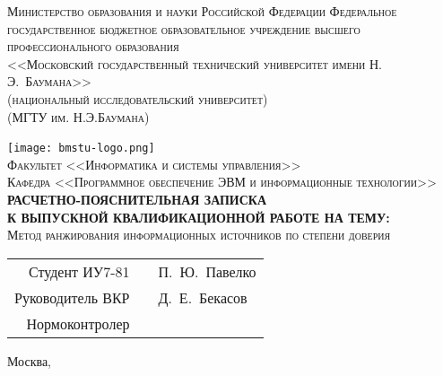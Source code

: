 \newcommand{\HRule}{\rule{\linewidth}{0.5mm}}

\begin{center}
\textsc{Министерство образования и науки Российской Федерации Федеральное государственное бюджетное образовательное учреждение высшего профессионального образования\\
<<Московский государственный технический университет имени Н.\,Э.~Баумана>>\\
(национальный исследовательский университет)\\
(МГТУ им. Н.Э.Баумана)\\}

\texttt{[image: bmstu-logo.png]}~\\

\textsc{Факультет <<Информатика и системы управления>>}\\
\textsc{Кафедра <<Программное обеспечение ЭВМ и информационные технологии>>}\\[1cm]

\textsc{\large \bfseries РАСЧЕТНО-ПОЯСНИТЕЛЬНАЯ ЗАПИСКА\\К ВЫПУСКНОЙ КВАЛИФИКАЦИОННОЙ РАБОТЕ НА ТЕМУ:}\\[1cm]

\textsc{\large Метод ранжирования информационных источников по степени доверия}

\vfill

\begin{flushright}
    \begin{tabular}{rll}
        Студент ИУ7-81 & \underline{\hspace{6cm}} & П.~Ю.~Павелко\\[0.5cm]
        Руководитель ВКР & \underline{\hspace{6cm}} & Д.~Е.~Бекасов\\[0.5cm]
        Нормоконтролер & \underline{\hspace{6cm}} & \underline{\hspace{3cm}}\\[0.5cm]
    \end{tabular}
\end{flushright}

{\large Москва, \the\year}
\end{center}

\newpage
{}
